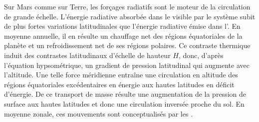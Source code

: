 \sk
Sur Mars comme sur Terre, les forçages radiatifs
sont le moteur de la circulation de grande échelle.
%
L'énergie radiative absorbée dans le visible
par le système 
subit de plus fortes variations latitudinales
que l'énergie radiative émise dans l'\IR.
%
En moyenne annuelle, il en résulte un chauffage net 
des régions équatoriales de la planète et
un refroidissement net de ses régions polaires.
%
Ce contraste thermique induit des contrastes latitudinaux d'échelle de hauteur $H$,
donc, d'après l'équation hypsométrique,
un gradient de pression latitudinal qui augmente avec l'altitude.
%
Une telle force méridienne entraîne une circulation en altitude
des régions équatoriales excédentaires en énergie
aux hautes latitudes en déficit d'énergie.
%
De ce transport de masse résulte une augmentation de la pression de surface
aux hautes latitudes et donc une circulation inversée proche du sol.
%
En moyenne zonale, ces mouvements sont conceptualisés par les
.


